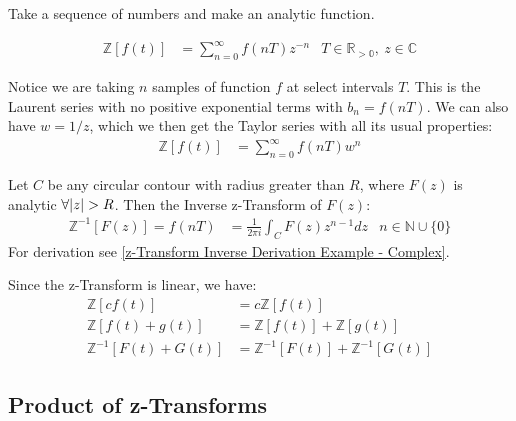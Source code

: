 \documentclass[12pt, english]{book}
\begin{document}
	Take a sequence of numbers and make an analytic function.
	
	\begin{definition}[z-Transform]
		\label{z-Transform Definition - Complex}
		\begin{align*}
			\mathbb{Z}[f(t)] &= \sum_{n=0}^{\infty} f(nT)z^{-n} 
				& T \in \mathbb{R_{>0}}, \ z \in \mathbb{C}
		\end{align*}
	\end{definition}

	Notice we are taking \(n\) samples of function \(f\) at select intervals \(T\). This is the Laurent series with no positive exponential terms with \(b_n = f(nT)\). We can also have \(w = 1/z\), which we then get the Taylor series with all its usual properties:
	\begin{align*}
		\mathbb{Z}[f(t)] &= \sum_{n=0}^{\infty} f(nT) w^n
	\end{align*}

	\begin{definition}
		Let \(C\) be any circular contour with radius greater than \(R\), where \(F(z)\) is analytic \(\forall \abs{z}>R\). Then the Inverse z-Transform of \(F(z)\):
		\begin{align*}
			\mathbb{Z}^{-1}[F(z)] = f(nT) &= \frac{1}{2\pi i} \int_{C} F(z) z^{n-1} dz
				& n \in \mathbb{N} \cup \{0\}
		\end{align*}
		For derivation see \cref{z-Transform Inverse Derivation Example - Complex}.
	\end{definition}

	Since the z-Transform is linear, we have:
	\begin{align*}
		\mathbb{Z}[cf(t)] &= c\mathbb{Z}[f(t)]\\
		\mathbb{Z}[f(t) + g(t)] &= \mathbb{Z}[f(t)] + \mathbb{Z}[g(t)] \\
		\mathbb{Z}^{-1}[F(t) + G(t)] &= \mathbb{Z}^{-1}[F(t)] + \mathbb{Z}^{-1}[G(t)] 
	\end{align*}
	
	\subsection{Product of z-Transforms} \label{Product of z-Transforms Subsection - Complex}
	
\end{document}
